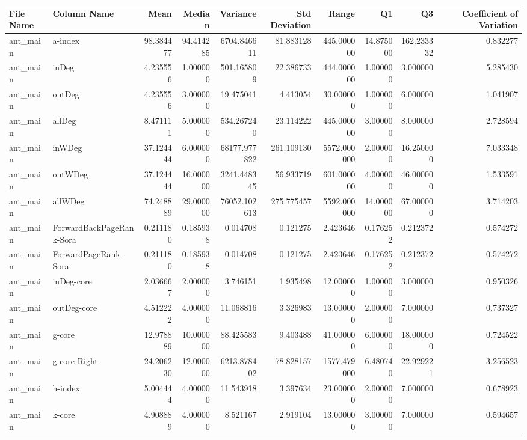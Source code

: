 \begin{tabular}{llrrrrrrrr}
\toprule
File Name & Column Name & Mean & Median & Variance & Std Deviation & Range & Q1 & Q3 & Coefficient of Variation \\
\midrule
ant_main & a-index & 98.384477 & 94.414285 & 6704.846611 & 81.883128 & 445.000000 & 14.875000 & 162.233332 & 0.832277 \\
ant_main & inDeg & 4.235556 & 1.000000 & 501.165809 & 22.386733 & 444.000000 & 1.000000 & 3.000000 & 5.285430 \\
ant_main & outDeg & 4.235556 & 3.000000 & 19.475041 & 4.413054 & 30.000000 & 1.000000 & 6.000000 & 1.041907 \\
ant_main & allDeg & 8.471111 & 5.000000 & 534.267240 & 23.114222 & 445.000000 & 3.000000 & 8.000000 & 2.728594 \\
ant_main & inWDeg & 37.124444 & 6.000000 & 68177.977822 & 261.109130 & 5572.000000 & 2.000000 & 16.250000 & 7.033348 \\
ant_main & outWDeg & 37.124444 & 16.000000 & 3241.448345 & 56.933719 & 601.000000 & 4.000000 & 46.000000 & 1.533591 \\
ant_main & allWDeg & 74.248889 & 29.000000 & 76052.102613 & 275.775457 & 5592.000000 & 14.000000 & 67.000000 & 3.714203 \\
ant_main & ForwardBackPageRank-Sora & 0.211180 & 0.185938 & 0.014708 & 0.121275 & 2.423646 & 0.176252 & 0.212372 & 0.574272 \\
ant_main & ForwardPageRank-Sora & 0.211180 & 0.185938 & 0.014708 & 0.121275 & 2.423646 & 0.176252 & 0.212372 & 0.574272 \\
ant_main & inDeg-core & 2.036667 & 2.000000 & 3.746151 & 1.935498 & 12.000000 & 1.000000 & 3.000000 & 0.950326 \\
ant_main & outDeg-core & 4.512222 & 4.000000 & 11.068816 & 3.326983 & 13.000000 & 2.000000 & 7.000000 & 0.737327 \\
ant_main & g-core & 12.978889 & 10.000000 & 88.425583 & 9.403488 & 41.000000 & 6.000000 & 18.000000 & 0.724522 \\
ant_main & g-core-Right & 24.206230 & 12.000000 & 6213.878402 & 78.828157 & 1577.479000 & 6.480740 & 22.929221 & 3.256523 \\
ant_main & h-index & 5.004444 & 4.000000 & 11.543918 & 3.397634 & 23.000000 & 2.000000 & 7.000000 & 0.678923 \\
ant_main & k-core & 4.908889 & 4.000000 & 8.521167 & 2.919104 & 13.000000 & 3.000000 & 7.000000 & 0.594657 \\

\end{tabular}
